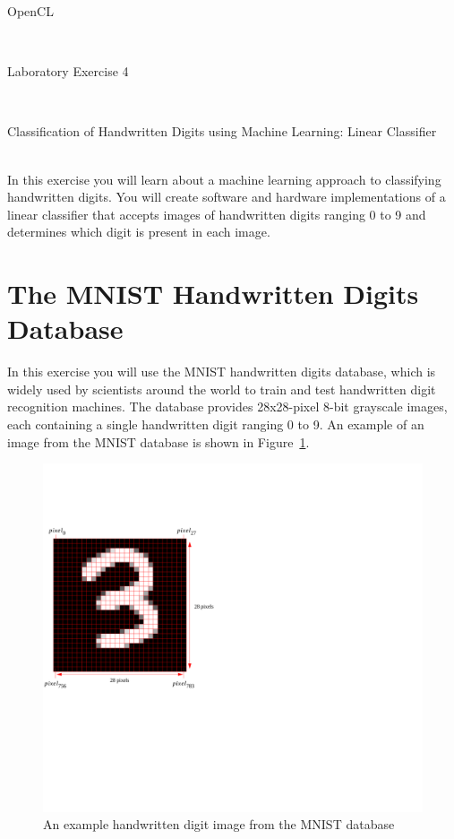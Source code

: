 \documentclass[epsfig,10pt,fullpage]{article}
\newcommand{\LabNum}{4}
\begin{document}
\centerline{\huge OpenCL}
~\\
\centerline{\huge Laboratory Exercise \LabNum}
~\\
\centerline{\large Classification of Handwritten Digits using Machine Learning: Linear Classifier}
~\\

In this exercise you will learn about a machine learning approach to classifying handwritten digits.
You will create software and hardware implementations of a linear classifier that accepts images of handwritten digits ranging 0 to 9 and determines which digit is present in each image.

\section*{The MNIST Handwritten Digits Database}

In this exercise you will use the MNIST handwritten digits database,  
which is widely used by scientists around the world to train and test handwritten digit recognition machines. 
The database provides 28x28-pixel 8-bit grayscale images, each containing a single handwritten digit ranging 0 to 9. An example of
an image from the MNIST database is shown in Figure~\ref{fig:mnist_image}.

\begin{figure}[H]
   \begin{center}
       \hspace*{1.5cm}\includegraphics[scale=0.7]{figures/fig_mnist_image}
   \end{center}
   \caption{An example handwritten digit image from the MNIST database}
	\label{fig:mnist_image}
\end{figure}
\end{document}
